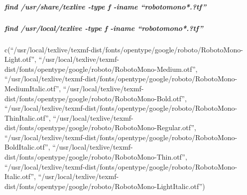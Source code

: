 \documentclass[
]{article}
\newenvironment{Shaded}{\begin{snugshade}}{\end{snugshade}}
\newcommand{\AttributeTok}[1]{\textcolor[rgb]{0.13,0.29,0.53}{#1}}
\newcommand{\ConstantTok}[1]{\textcolor[rgb]{0.56,0.35,0.01}{#1}}
\newcommand{\ControlFlowTok}[1]{\textcolor[rgb]{0.13,0.29,0.53}{\textbf{#1}}}
\newcommand{\DecValTok}[1]{\textcolor[rgb]{0.00,0.00,0.81}{#1}}
\newcommand{\FunctionTok}[1]{\textcolor[rgb]{0.13,0.29,0.53}{\textbf{#1}}}
\newcommand{\NormalTok}[1]{#1}
\newcommand{\SpecialCharTok}[1]{\textcolor[rgb]{0.81,0.36,0.00}{\textbf{#1}}}
\newcommand{\StringTok}[1]{\textcolor[rgb]{0.31,0.60,0.02}{#1}}
\begin{document}
\hypertarget{find-usrsharetexlive--type-f--iname-robotomono.tf}{%
\subparagraph{\texorpdfstring{find /usr/share/texlive -type f -iname
``\emph{roboto}mono*.?tf''}{find /usr/share/texlive -type f -iname ``robotomono*.?tf''}}\label{find-usrsharetexlive--type-f--iname-robotomono.tf}}

\hypertarget{find-usrlocaltexlive--type-f--iname-robotomono.tf}{%
\subparagraph{\texorpdfstring{find /usr/local/texlive -type f -iname
``\emph{roboto}mono*.?tf''}{find /usr/local/texlive -type f -iname ``robotomono*.?tf''}}\label{find-usrlocaltexlive--type-f--iname-robotomono.tf}}

\begin{Shaded}
\end{Shaded}

c(``/usr/local/texlive/texmf-dist/fonts/opentype/google/roboto/RobotoMono-Light.otf'',
``/usr/local/texlive/texmf-dist/fonts/opentype/google/roboto/RobotoMono-Medium.otf'',
``/usr/local/texlive/texmf-dist/fonts/opentype/google/roboto/RobotoMono-MediumItalic.otf'',
``/usr/local/texlive/texmf-dist/fonts/opentype/google/roboto/RobotoMono-Bold.otf'',
``/usr/local/texlive/texmf-dist/fonts/opentype/google/roboto/RobotoMono-ThinItalic.otf'',
``/usr/local/texlive/texmf-dist/fonts/opentype/google/roboto/RobotoMono-Regular.otf'',
``/usr/local/texlive/texmf-dist/fonts/opentype/google/roboto/RobotoMono-BoldItalic.otf'',
``/usr/local/texlive/texmf-dist/fonts/opentype/google/roboto/RobotoMono-Thin.otf'',
``/usr/local/texlive/texmf-dist/fonts/opentype/google/roboto/RobotoMono-Italic.otf'',
``/usr/local/texlive/texmf-dist/fonts/opentype/google/roboto/RobotoMono-LightItalic.otf'')
\end{document}
